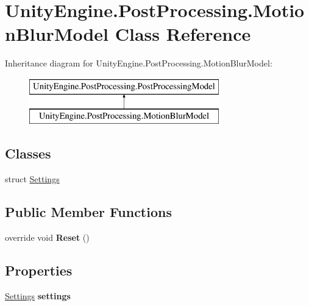 \hypertarget{class_unity_engine_1_1_post_processing_1_1_motion_blur_model}{}\section{Unity\+Engine.\+Post\+Processing.\+Motion\+Blur\+Model Class Reference}
\label{class_unity_engine_1_1_post_processing_1_1_motion_blur_model}
Inheritance diagram for Unity\+Engine.\+Post\+Processing.\+Motion\+Blur\+Model\+:\begin{figure}[H]
\begin{center}
\leavevmode
\includegraphics[height=2.000000cm]{class_unity_engine_1_1_post_processing_1_1_motion_blur_model}
\end{center}
\end{figure}
\subsection*{Classes}
\begin{DoxyCompactItemize}
\item 
struct \hyperlink{struct_unity_engine_1_1_post_processing_1_1_motion_blur_model_1_1_settings}{Settings}
\end{DoxyCompactItemize}
\subsection*{Public Member Functions}
\begin{DoxyCompactItemize}
\item 
\mbox{\label{class_unity_engine_1_1_post_processing_1_1_motion_blur_model_a04196279454910f3f9c840378a80b8c7}} 
override void {\bfseries Reset} ()
\end{DoxyCompactItemize}
\subsection*{Properties}
\begin{DoxyCompactItemize}
\item 
\mbox{\label{class_unity_engine_1_1_post_processing_1_1_motion_blur_model_ac570d8bef9ee96c2728292da1aff5af3}} 
\hyperlink{struct_unity_engine_1_1_post_processing_1_1_motion_blur_model_1_1_settings}{Settings} {\bfseries settings}
\end{DoxyCompactItemize}
